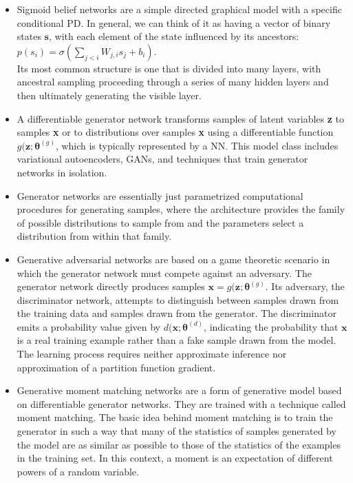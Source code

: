 \documentclass{article}
\begin{document}
\begin{itemize}
\item Sigmoid belief networks are a simple directed graphical model with a specific conditional PD. In general, we can think of it as having a vector of binary states \(\boldsymbol{s}\), with each element of the state influenced by its ancestors: \(p(s_i)=\sigma(\sum_{j<i}W_{j,i}s_j + b_i)\).\\Its most common structure is one that is divided into many layers, with ancestral sampling proceeding through a series of many hidden layers and then ultimately generating the visible layer.
\item A differentiable generator network transforms samples of latent variables \textbf{z} to samples \textbf{x} or to distributions over samples \textbf{x} using a differentiable function \(g(\boldsymbol{z};\boldsymbol{\theta}^{(g)}\), which is typically represented by a NN. This model class includes variational autoencoders, GANs, and techniques that train generator networks in isolation.
\item Generator networks are essentially just parametrized computational procedures for generating samples, where the architecture provides the family of possible distributions to sample from and the parameters select a distribution from within that family.
\item Generative adversarial networks are based on a game theoretic scenario in which the generator network must compete against an adversary. The generator network directly produces samples \(\boldsymbol{x}=g(\boldsymbol{z};\boldsymbol{\theta}^{(g)}\). Its adversary, the discriminator network, attempts to distinguish between samples drawn from the training data and samples drawn from the generator. The discriminator emits a probability value given by \(d(\boldsymbol{x};\boldsymbol{\theta}^{(d)}\), indicating the probability that \(\boldsymbol{x}\) is a real training example rather than a fake sample drawn from the model.\\The learning process requires neither approximate inference nor approximation of a partition function gradient.
\item Generative moment matching networks are a form of generative model based on differentiable generator networks. They are trained with a technique called moment matching. The basic idea behind moment matching is to train the generator in such a way that many of the statistics of samples generated by the model are as similar as possible to those of the statistics of the examples in the training set. In this context, a moment is an expectation of different powers of a random variable.

\end{itemize}
\end{document}
